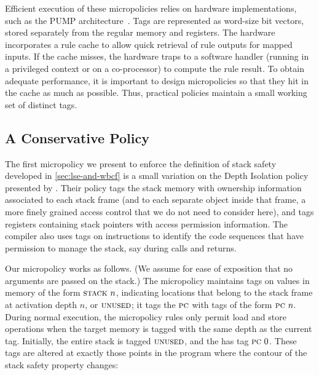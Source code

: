 \documentclass[acmsmall,review,anonymous]{acmart}\settopmatter{printfolios=true,printccs=false,printacmref=false}
\begin{document}
{Efficient execution of these micropolicies relies on hardware implementations,
such as the PUMP architecture~\citep{pump:asplos2015}.  Tags are represented
as word-size bit vectors, stored separately from the regular memory and registers.
The hardware incorporates a rule cache
to allow quick retrieval of rule outputs for mapped inputs. If the cache misses,
the hardware traps to a software handler (running in a privileged context or
on a co-processor) to compute the rule result. To obtain adequate performance,
it is important to design micropolicies so that they hit in the cache as
much as possible. Thus, practical policies maintain a small working set of
distinct tags.

\subsection{A Conservative Policy}
\label{sec:conservative}
%
The first micropolicy we present to enforce the definition of stack
safety developed in \cref{sec:lse-and-wbcf} is a small variation
on the Depth Isolation policy presented by
\citet{DBLP:conf/sp/RoesslerD18}. Their policy tags the stack memory
with ownership information associated to each stack frame (and to each
separate object inside that frame, a more finely grained access
control that we do not need to consider here), and tags registers containing
stack pointers with access permission information. The compiler also
uses tags on instructions to identify the code 
sequences that have permission to manage the stack, say during calls and returns.

Our micropolicy works as follows. (We assume for ease of exposition that no
arguments are passed on the stack.)
The micropolicy maintains tags on values in memory of the form $\textsc{stack} ~ n$,
indicating locations that belong to the stack frame at activation depth $n$,
or $\textsc{unused}$; it tags the $\textsc{pc}$ with tags of the form $\textsc{pc} ~ n$.
During normal execution, the micropolicy rules only permit load and store operations
when the target memory is tagged with the same depth as the current {\PCname} tag.
Initially, the entire stack is tagged $\textsc{unused}$,
and the {\PCname} has tag $\textsc{pc} ~ 0$. These tags are altered
at exactly those points in
the program where the contour of the stack safety property changes:

}
\end{document}
